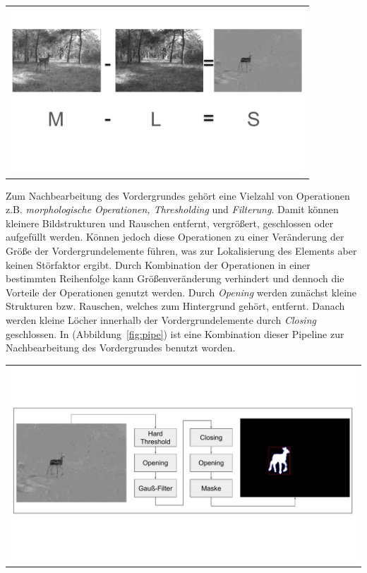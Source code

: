 \begin{center}
\begin{tabular}{c}
\includegraphics[trim={0, 4cm, 0 ,5cm},clip=ture,width=11cm]{img/Segmentierung/foreground-image}
\end{tabular}
\label{fig:foreground}
\end{center}
\noindent Zum Nachbearbeitung des Vordergrundes gehört eine Vielzahl von Operationen 
z.B. \textit{morphologische Operationen, Thresholding} und \textit{Filterung}.
Damit können kleinere Bildstrukturen und Rauschen entfernt, vergrößert, geschlossen oder aufgefüllt werden. Können jedoch diese Operationen zu einer Veränderung der Größe der Vordergrundelemente führen, was zur Lokalisierung des Elements aber keinen Störfaktor ergibt. Durch Kombination der Operationen in einer bestimmten Reihenfolge kann Größenveränderung verhindert und dennoch die Vorteile der Operationen genutzt werden. Durch \textit{Opening} werden zunächst kleine Strukturen bzw. Rauschen, welches zum Hintergrund gehört, entfernt. Danach werden kleine Löcher innerhalb der Vordergrundelemente durch \textit{Closing} geschlossen. In (Abbildung~\ref{fig:pipe}) ist eine Kombination dieser  Pipeline zur Nachbearbeitung des Vordergrundes benutzt worden.
\begin{center}
\begin{tabular}{c}
\includegraphics[trim={0 3cm 0cm 3cm},clip=true,width=13cm]{img/Segmentierung/pipe.pdf}
\end{tabular}
\label{fig:pipe}
\end{center}

